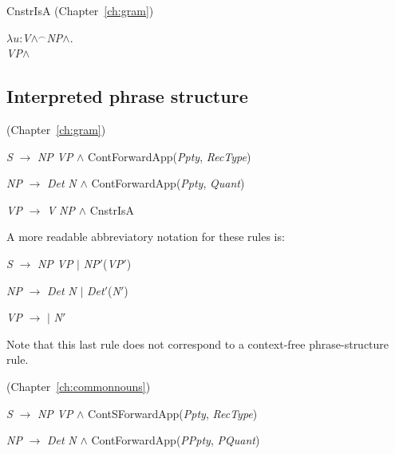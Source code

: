 CnstrIsA (Chapter~\ref{ch:gram})

$\lambda
u$:\textit{V}\d{$\wedge$}$^{\frown}$\textit{NP}\d{$\wedge$}. \\
\hspace*{1em}
\textit{VP}\d{$\wedge$}

\subsection{Interpreted phrase structure}
\label{app:interpps}

(Chapter~\ref{ch:gram})

\textit{S} $\longrightarrow$ \textit{NP} \textit{VP} \d{\d{$\wedge$}}
ContForwardApp(\textit{Ppty}, \textit{RecType}) 

\textit{NP} $\longrightarrow$ \textit{Det} \textit{N} \d{\d{$\wedge$}}
ContForwardApp(\textit{Ppty}, \textit{Quant}) 

\textit{VP} $\longrightarrow$ \textit{V} \textit{NP} \d{\d{$\wedge$}}
CnstrIsA

A more readable abbreviatory notation for these rules is:

\textit{S} $\longrightarrow$ \textit{NP} \textit{VP} $\mid$
\textit{NP}$'$(\textit{VP}$'$)

\textit{NP} $\longrightarrow$ \textit{Det} \textit{N} $\mid$
\textit{Det}$'$(\textit{N}$'$)

\textit{VP} $\longrightarrow$ 
 $\mid$
\textit{N}$'$

Note that this last rule does not correspond to a context-free
phrase-structure rule.

(Chapter~\ref{ch:commonnouns})

\textit{S} $\longrightarrow$ \textit{NP} \textit{VP} \d{\d{$\wedge$}}
ContSForwardApp(\textit{Ppty}, \textit{RecType}) 

\textit{NP} $\longrightarrow$ \textit{Det} \textit{N} \d{\d{$\wedge$}}
ContForwardApp(\textit{PPpty}, \textit{PQuant}) 

